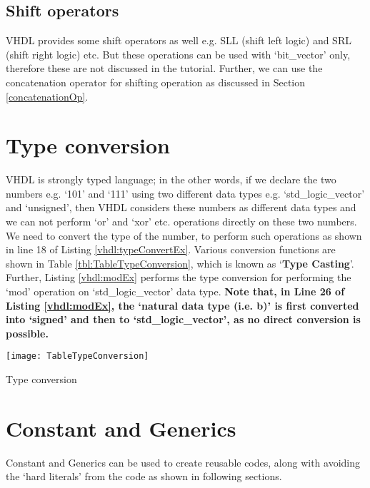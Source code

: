 \subsection{Shift operators}
VHDL provides some shift operators as well e.g. SLL (shift left logic) and SRL (shift right logic) etc. But these operations can be used with `bit\_vector' only, therefore these are not discussed in the tutorial. Further, we can use the concatenation operator for shifting operation as discussed in Section \ref{concatenationOp}. 

\section{Type conversion}\label{sec:typeconversion}
VHDL is strongly typed language; in the other words, if we declare the two numbers e.g. `101' and `111' using two different data types e.g. `std\_logic\_vector' and `unsigned', then VHDL considers these numbers as different data types and we can not perform `or' and `xor' etc. operations directly on these two numbers. We need to convert the type of the number, to perform such operations as shown in line 18 of Listing \ref{vhdl:typeConvertEx}. Various conversion functions are shown in Table \ref{tbl:TableTypeConversion}, which is known as `\textbf{Type Casting}'. Further, Listing \ref{vhdl:modEx} performs the type conversion for performing the `mod' operation on `std\_logic\_vector' data type. \textbf{Note that, in Line 26 of Listing \ref{vhdl:modEx}, the `natural data type (i.e. b)' is first converted into `signed' and then to `std\_logic\_vector', as no direct conversion is possible. }

\begin{table}
	\centering
	\texttt{[image: TableTypeConversion]}
	\caption{Type conversion}
	\label{tbl:TableTypeConversion}
\end{table}






\section{Constant and Generics}
Constant and Generics can be used to create reusable codes, along with avoiding the `hard literals' from the code as shown in following sections. 

